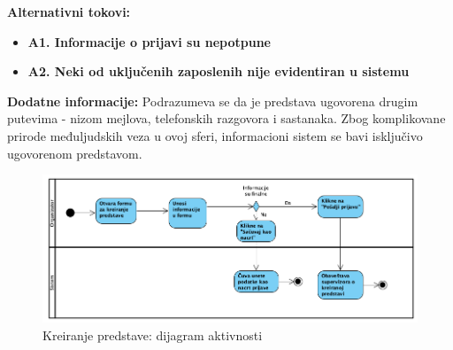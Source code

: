 \documentclass[a4paper]{article}
\begin{document}
\noindent\textbf{Alternativni tokovi:} 
\begin{itemize}
  \item \textbf{A1. Informacije o prijavi su nepotpune} 
  \item \textbf{A2. Neki od uključenih zaposlenih nije evidentiran u sistemu} 
\end{itemize}

\noindent\textbf{Dodatne informacije:} Podrazumeva se da je predstava ugovorena drugim putevima - nizom mejlova, telefonskih razgovora i sastanaka. Zbog komplikovane prirode međuljudskih veza u ovoj sferi, informacioni sistem se bavi isključivo ugovorenom predstavom. 

\begin{figure}[H]
  \begin{center}
      \includegraphics[width=160mm]{../images/dijagram_aktivnosti_kreiranje_predstave.png}
  \end{center}
  \caption{Kreiranje predstave: dijagram aktivnosti}
  \label{dijagram_aktivnosti_kreiranje_predstave}
\end{figure}
\end{document}
